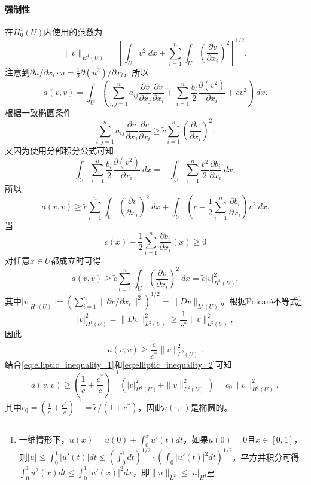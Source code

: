 \documentclass[a4paper,10pt]{ctexart}
\begin{document}
\paragraph*{强制性} 
在$ H^1_0(U) $内使用的范数为
\[
    \| v \|_{H^1(U)} = \left[ \int_U  v^2\ d x + \sum_{i=1}^n\int_U \left( \dfrac{\partial v}{\partial x_i} \right)^2 \right]^{1/2},
\]
注意到$ \partial u / \partial x_i \cdot u = \frac{1}{2}\partial (u^2) / \partial x_i $，所以
\[
    a(v,v) = \int_U \left( \sum_{i,j=1}^n a_{ij}\frac{\partial v}{\partial x_j}\frac{\partial v}{\partial x_i} + \sum_{i=1}^n \frac{b_i}{2}\frac{\partial (v^2)}{\partial x_i} + cv^2 \right)\ d x.
\]
根据一致椭圆条件
\[
    \sum_{i,j=1}^n a_{ij}\frac{\partial v}{\partial x_j}\frac{\partial v}{\partial x_i} \geqslant \tilde{c}\sum_{i=1}^n \left( \frac{\partial v}{\partial x_i} \right)^2,
\]
又因为使用分部积分公式可知
\[
    \int_U \sum_{i=1}^n \frac{b_i}{2}\frac{\partial (v^2)}{\partial x_i}\ d x = -\int_U \sum_{i=1}^n \frac{v^2}{2} \dfrac{\partial b_i}{\partial x_i} \ dx,
\]
所以
\begin{equation}
    a(v,v) \geqslant \tilde{c} \sum_{i=1}^n \int_U\left( \frac{\partial v}{\partial x_i} \right)^2\ dx + \int_U \left( c-\frac{1}{2} \sum_{i=1}^n\dfrac{\partial b_i}{\partial x_i}  \right) v^2\ dx.
\end{equation}
当
\begin{equation}\label{eq:elliptic_inequality}
    c(x)-\frac{1}{2} \sum_{i=1}^n\dfrac{\partial b_i}{\partial x_i}(x) \geqslant 0
\end{equation}
对任意$ x\in U $都成立时可得
\begin{equation}\label{eq:elliptic_inequality_1}
    a(v,v) \geqslant \tilde{c} \sum_{i=1}^n \int_U\left( \frac{\partial v}{\partial x_i} \right)^2\ dx = \tilde{c}| v |_{H^1(U)}^2,
\end{equation}
其中$ | v |_{H^1(U)} := \left( \sum_{i=1}^n \| \partial v / \partial x_i \|^2  \right)^{1 / 2}  = \| Dv \|_{L^2(U)} $。根据Poicaré不等式\footnote{一维情形下，$ u(x) = u(0) + \int^x_{0}u'(t)dt $，如果$ u(0)=0 $且$ x\in[0,1] $，则$ |u|\leqslant \int_0^1 |u'(t)|dt \leqslant (\int_0^1 dt)^{1 / 2}\cdot (\int_0^1|u'(t)|^2dt)^{1 / 2} $，平方并积分可得$ \int_0^1 u^2(x)dt \leqslant \int_0^1 |u'(x)|^2 dx $，即$ \| u \|_{L^2}\leqslant |u|_{H^1} $}
\begin{equation}
    | v |_{H^1(U)}^2  = \| Dv \|_{L^2(U)}^2 \geqslant \frac{1}{c^*}\| v \|_{L^2(U)}^2,
\end{equation}
因此
\begin{equation}\label{eq:elliptic_inequality_2}
    a(v,v) \geqslant \frac{\tilde{c}}{c^*} \| v \|_{L^2(U)}^2.
\end{equation}
结合\eqref{eq:elliptic_inequality_1}和\eqref{eq:elliptic_inequality_2}可知
\begin{equation}
    a(v,v) \geqslant (\frac{1}{\tilde{c}}+\frac{c^*}{\tilde{c}})^{-1} (| v |_{H^1(U)}^2+\| v \|_{L^2(U)}^2) = c_0\| v \|_{H^1(U)}^2,
\end{equation}
其中$ c_0 = (\frac{1}{\tilde{c}}+\frac{c^*}{\tilde{c}})^{-1} = \tilde{c} / (1+c^*) $，因此$ a(\cdot,\cdot) $是椭圆的。
\end{document}
